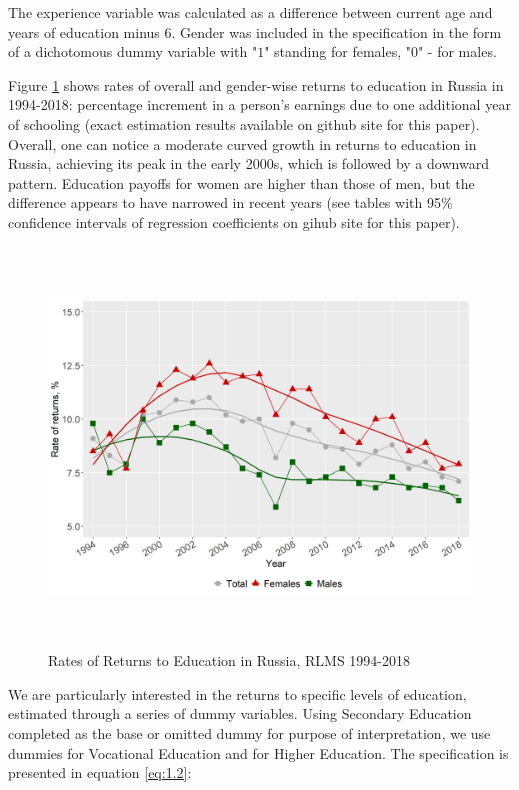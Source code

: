 \documentclass[12pt,a4paper]{article}
\numberwithin{equation}{section}
\begin{document}
The experience variable was calculated as a difference between current age and years of education minus $6$. Gender was included in the specification in the form of a dichotomous dummy variable with "$1$" standing for females, "$0$" - for males.


Figure \ref{fig:1.2} shows rates of overall and gender-wise returns to education in Russia in 1994-2018: percentage increment in a person's earnings due to one additional year of schooling (exact estimation results available on github site for this paper). Overall, one can notice a moderate curved growth in returns to education in Russia, achieving its peak in the early 2000s, which is followed by a downward pattern. Education payoffs for women are higher than those of men, but the difference appears to have narrowed in recent years (see tables with 95\% confidence intervals of regression coefficients on gihub site for this paper).

\begin{figure}[H]
 \centering
 \includegraphics[width=\textwidth, height=300pt]{re_edu.png}
 \caption{Rates of Returns to Education in Russia, RLMS 1994-2018}\label{fig:1.2}
\end{figure}

We are particularly interested in the returns to specific levels of education, estimated through a series of dummy variables. Using Secondary Education completed as the base or omitted dummy for purpose of interpretation, we use dummies for Vocational Education and for Higher Education. The specification is presented in equation \eqref{eq:1.2}: 
\end{document}
